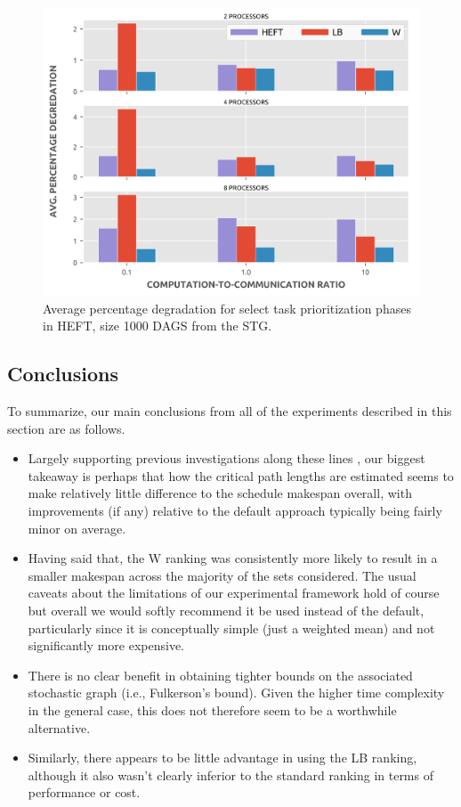 \documentclass[12pt]{article}
\begin{document}
\begin{figure}
	\centering	
	\includegraphics[scale=0.8]{1000tasks_apd.png}
	\caption{Average percentage degradation for select task prioritization phases in HEFT, size 1000 DAGS from the STG.}	
	\label{plot.rankings_apd_1000}
\end{figure}

\subsection{Conclusions}
\label{subsect.conclusions}

To summarize, our main conclusions from all of the experiments described in this section are as follows.
\begin{itemize}
	\item Largely supporting previous investigations along these lines \cite{zhao03}, our biggest takeaway is perhaps that how the critical path lengths are estimated seems to make relatively little difference to the schedule makespan overall, with improvements (if any) relative to the default approach typically being fairly minor on average.
	\item Having said that, the W ranking was consistently more likely to result in a smaller makespan across the majority of the sets considered. The usual caveats about the limitations of our experimental framework hold of course but overall we would softly recommend it be used instead of the default, particularly since it is conceptually simple (just a weighted mean) and not significantly more expensive.
	\item There is no clear benefit in obtaining tighter bounds on the associated stochastic graph (i.e., Fulkerson's bound). Given the higher time complexity in the general case, this does not therefore seem to be a worthwhile alternative.    
	\item Similarly, there appears to be little advantage in using the LB ranking, although it also wasn't clearly inferior to the standard ranking in terms of performance or cost.  
\end{itemize} 
\end{document}
